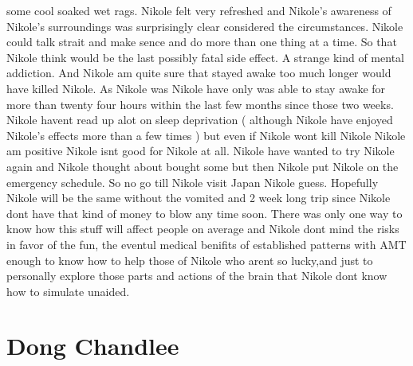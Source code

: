 \documentclass[12pt]{book}
\begin{document}
some cool soaked wet rags. Nikole felt very refreshed and Nikole's awareness of Nikole's surroundings was surprisingly clear considered the circumstances. Nikole could talk strait and make sence and do more than one thing at a time. So that Nikole think would be the last possibly fatal side effect. A strange kind of mental addiction. And Nikole am quite sure that stayed awake too much longer would have killed Nikole. As Nikole was Nikole have only was able to stay awake for more than twenty four hours within the last few months since those two weeks. Nikole havent read up alot on sleep deprivation ( although Nikole have enjoyed Nikole's effects more than a few times ) but even if Nikole wont kill Nikole Nikole am positive Nikole isnt good for Nikole at all. Nikole have wanted to try Nikole again and Nikole thought about bought some but then Nikole put Nikole on the emergency schedule. So no go till Nikole visit Japan Nikole guess. Hopefully Nikole will be the same without the vomited and 2 week long trip since Nikole dont have that kind of money to blow any time soon. There was only one way to know how this stuff will affect people on average and Nikole dont mind the risks in favor of the fun, the eventul medical benifits of established patterns with AMT enough to know how to help those of Nikole who arent so lucky,and just to personally explore those parts and actions of the brain that Nikole dont know how to simulate unaided.



\chapter{Dong Chandlee}
\end{document}
